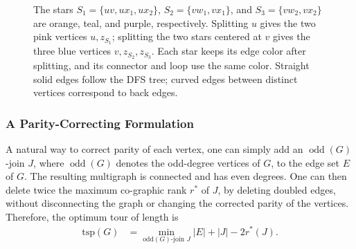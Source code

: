 \documentclass[11pt]{amsart}
\DeclareMathOperator{\odd}{odd}
\newcommand{\1}{\mathbbm{1}}
\begin{document}
\begin{figure}[!t]
\caption{The stars $S_1=\{uv,ux_1,ux_2\}$,
$S_2=\{vw_1,vx_1\}$, and $S_3=\{vw_2,vx_2\}$
are orange, teal, and purple, respectively.
Splitting $u$ gives the two pink vertices $u,z_{S_1}$;
splitting the two stars centered at $v$ gives the three blue
vertices $v,z_{S_2},z_{S_3}$.
Each star keeps its edge color after splitting, and its
connector and loop use the same color.
Straight solid edges follow the DFS tree; curved edges
between distinct vertices correspond to back edges.}
\label{proc:star-split}
\end{figure}

\subsubsection{A Parity-Correcting Formulation} 
A natural way to correct parity of each vertex, one can simply add an $\odd(G)$-join $J$, where $\odd(G)$ denotes the odd-degree
vertices of $G$, to the edge set $E$ of $G$. The resulting multigraph is connected and has even degrees. One can then delete twice the maximum co-graphic rank $r^*$ of $J$, by deleting doubled edges, without disconnecting the graph or changing the corrected parity of the vertices. Therefore, the optimum tour of length is \begin{align}
\text{tsp}(G) &= \min_{\text{odd}(G)\text{-join } J} |E| + |J| - 2r^*(J).\label{eq:matroid-join}
\end{align}
\end{document}

